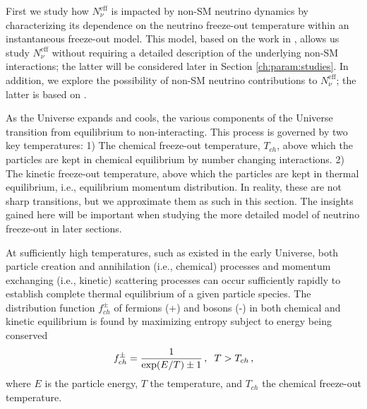 First we study how $N^{\text{eff}}_{\nu}$ is impacted by non-SM neutrino dynamics by characterizing its dependence on the neutrino freeze-out temperature within an instantaneous freeze-out model.  This model, based on the work in \cite{Birrell:2013gpa,Birrell:2012gg}, allows us study $N^{\text{eff}}_{\nu}$ without  requiring a detailed description of the underlying  non-SM interactions; the latter will be considered later in Section \ref{ch:param:studies}.   In addition,   we explore the possibility of non-SM neutrino contributions to $N^{\text{eff}}_\nu$; the latter is based on \cite{Birrell:2014cja}.


As the Universe expands and cools, the various components of the Universe transition  from equilibrium to non-interacting. This process is governed by two key temperatures: 1) The chemical freeze-out temperature, $T_{ch}$, above which the particles are kept in chemical  equilibrium by number changing interactions. 2) The  kinetic freeze-out temperature, above which the particles are kept in thermal equilibrium, i.e., equilibrium momentum distribution.  In reality, these are not sharp transitions, but we approximate them as such in this section.  The insights gained here will be important when studying the more detailed model of neutrino freeze-out in later sections.

At sufficiently high temperatures, such as existed in the early Universe, both particle creation and annihilation (i.e., chemical) processes and momentum exchanging (i.e., kinetic) scattering processes can occur sufficiently rapidly to establish complete thermal equilibrium of a given particle species. The  distribution function $f_{ch}^\pm$ of  fermions (+) and bosons (-) in both chemical and kinetic equilibrium is found by maximizing entropy subject to energy being conserved
\begin{equation}\label{ch_eq}
f_{ch}^\pm=\frac{1}{\exp(E/T)\pm 1}\,, \hspace{2mm} T>T_{ch}\,,
\end{equation}
where $E$ is the particle energy, $T$ the temperature, and $T_{ch}$ the chemical freeze-out temperature. 

